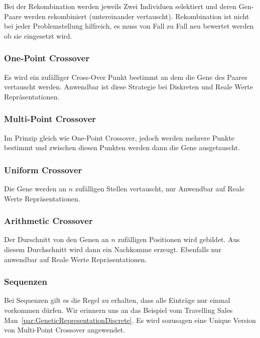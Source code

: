         Bei der Rekombination werden jeweils Zwei Individuen selektiert und
        deren Gen-Paare werden rekombiniert (untereinander vertauscht).
        Rekombination ist nicht bei jeder Problemstellung hilfreich,
        es muss von Fall zu Fall neu bewertet werden ob sie eingesetzt wird.

        \subsubsection{One-Point Crossover}

          Es wird ein zufälliger Cross-Over Punkt bestimmt an dem die Gene des Paares vertauscht werden.
          Anwendbar ist diese Strategie bei Diskreten und Reale Werte Repräsentationen.

        \subsubsection{Multi-Point Crossover}

          Im Prinzip gleich wie One-Point Crossover, jedoch werden mehrere Punkte bestimmt und
          zwischen diesen Punkten werden dann die Gene ausgetauscht.

        \subsubsection{Uniform Crossover}

          Die Gene werden an \(n\) zufälligen Stellen vertauscht, nur Anwendbar auf Reale Werte Repräsentationen.

        \subsubsection{Arithmetic Crossover}

          Der Durschnitt von den Genen an \(n\) zufälligen Positionen wird gebildet.
          Aus diesem Durchschnitt wird dann ein Nachkomme erzeugt.
          Ebenfalls nur anwendbar auf Reale Werte Repräsentationen.

        \subsubsection{Sequenzen}

          Bei Sequenzen gilt es die Regel zu erhalten, dass alle Einträge nur einmal vorkommen dürfen.
          Wir erinnern uns an das Beispiel vom Travelling Sales Man~\vref{par:GeneticRepresentationDiscrete}.
          Es wird sozusagen eine Unique Version von  Multi-Point Crossover angewendet.

